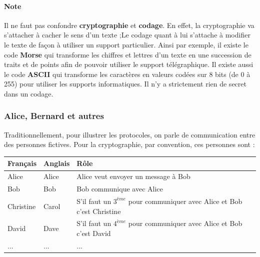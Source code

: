 				\paragraph{Note}
				Il ne faut pas confondre \textbf{cryptographie} et \textbf{codage}. En effet, la cryptographie va s'attacher à cacher le sens d'un texte ;Le codage quant à lui s'attache à modifier le texte de façon à utiliser un support particulier. Ainsi par exemple, il existe le code \textbf{Morse} qui transforme les chiffres et lettres d'un texte en une succession de traits et de points afin de pouvoir utiliser le support télégraphique. Il existe aussi le code \textbf{ASCII} qui transforme les caractères en valeurs codées sur 8
bits (de 0 à 255) pour utiliser les supports informatiques. Il n'y a strictement rien de secret dans un codage.
			\subsubsection{Alice, Bernard et autres}
				Traditionnellement, pour illustrer les protocoles, on parle de communication entre des personnes fictives. Pour la cryptographie, par convention, ces personnes sont :
				\begin{center}
					\begin{tabular}{|l|l|l|}
						\hline
						\rowcolor{gray!40}Français&Anglais&Rôle\\\hline
						Alice & Alice & Alice veut envoyer un message à Bob \\\hline
						Bob & Bob & Bob communique avec Alice \\\hline
						Christine & Carol & S'il faut un $3^{ème}$ pour communiquer avec Alice et Bob c'est Christine\\\hline
						David & Dave &  S'il faut un $4^{ème}$ pour communiquer avec Alice et Bob c'est David\\\hline
						... & ... & ...\\
					
					\end{tabular}
				\end{center}
				
				
				
				
				
				
				
				
				
				
				
				
				
				
				
				
				
				
				
